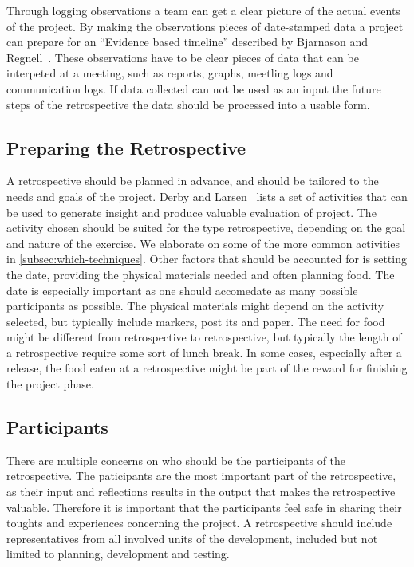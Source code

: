 \documentclass[12pt]{article}
\begin{document}
Through logging observations a team can get a clear picture of the actual events of the project. By making the observations pieces of date-stamped data a project can prepare for an ``Evidence based timeline'' described by Bjarnason and Regnell~\cite{Bjarnason2012}. These observations have to be clear pieces of data that can be interpeted at a meeting, such as reports, graphs, meetling logs and communication logs. If data collected can not be used as an input the future steps of the retrospective the data should be processed into a usable form. 

\subsection{Preparing the Retrospective}
A retrospective should be planned in advance, and should be tailored to the needs and goals of the project. Derby and Larsen~\cite{Derby2007} lists a set of activities that can be used to generate insight and produce valuable evaluation of project. The activity chosen should be suited for the type retrospective, depending on the goal and nature of the exercise. We elaborate on some of the more common activities in \autoref{subsec:which-techniques}. Other factors that should be accounted for is setting the date, providing the physical materials needed and often planning food. The date is especially important as one should accomedate as many possible participants as possible. The physical materials might depend on the activity selected, but typically include markers, post its and paper. The need for food might be different from retrospective to retrospective, but typically the length of a retrospective require some sort of lunch break. In some cases, especially after a release, the food eaten at a retrospective might be part of the reward for finishing the project phase.


\subsection{Participants}
There are multiple concerns on who should be the participants of the retrospective.  The paticipants are the most important part of the retrospective, as their input and reflections results in the output that makes the retrospective valuable. Therefore it is important that the participants feel safe in sharing their toughts and experiences concerning the project. A retrospective should include representatives from all involved units of the development, included but not limited to planning, development and testing. 
\end{document}
